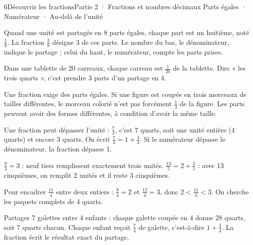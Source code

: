 \begin{ouverture}[calcul]{6}{Découvrir les fractions}{Partie 2 · Fractions et nombres décimaux}
{Parts égales · Numérateur · Au-delà de l’unité}
\end{ouverture}
\pagestyle{otMain}\essentiel\fontsize{11}{15}\selectfont
{}\label{cours-6-1}
\begin{definition}Quand une unité est partagée en 8 parts égales, chaque part est un huitième, noté $\frac18$. La fraction $\frac38$ désigne 3 de ces parts. Le nombre du bas, le dénominateur, indique le partage ; celui du haut, le numérateur, compte les parts prises.\end{definition}
\label{fig-cours-6-1-cours-parts}

\begin{exemple}Dans une tablette de 20 carreaux, chaque carreau est $\frac1{20}$ de la tablette. Dire « les trois quarts », c’est prendre 3 parts d’un partage en 4.\end{exemple}
\begin{attention}Une fraction exige des parts égales. Si une figure est coupée en trois morceaux de tailles différentes, le morceau colorié n’est pas forcément $\frac13$ de la figure. Les parts peuvent avoir des formes différentes, à condition d’avoir la même taille.\end{attention}
\clearpage
{}\label{cours-6-2}
\begin{propriete}Une fraction peut dépasser l’unité : $\frac74$, c’est 7 quarts, soit une unité entière (4 quarts) et encore 3 quarts. On écrit $\frac74=1+\frac34$. Si le numérateur dépasse le dénominateur, la fraction dépasse 1.\end{propriete}
\begin{exemple}$\frac93=3$ : neuf tiers remplissent exactement trois unités. $\frac{13}5=2+\frac35$ : avec 13 cinquièmes, on remplit 2 unités et il reste 3 cinquièmes.\end{exemple}
\begin{savoirfaire}Pour encadrer $\frac{11}4$ entre deux entiers : $\frac84=2$ et $\frac{12}4=3$, donc $2<\frac{11}4<3$. On cherche les paquets complets de 4 quarts.\end{savoirfaire}
\begin{savoirfaire}Partager 7 galettes entre 4 enfants : chaque galette coupée en 4 donne 28 quarts, soit 7 quarts chacun. Chaque enfant reçoit $\frac74$ de galette, c’est-à-dire $1+\frac34$. La fraction écrit le résultat exact du partage.\end{savoirfaire}

